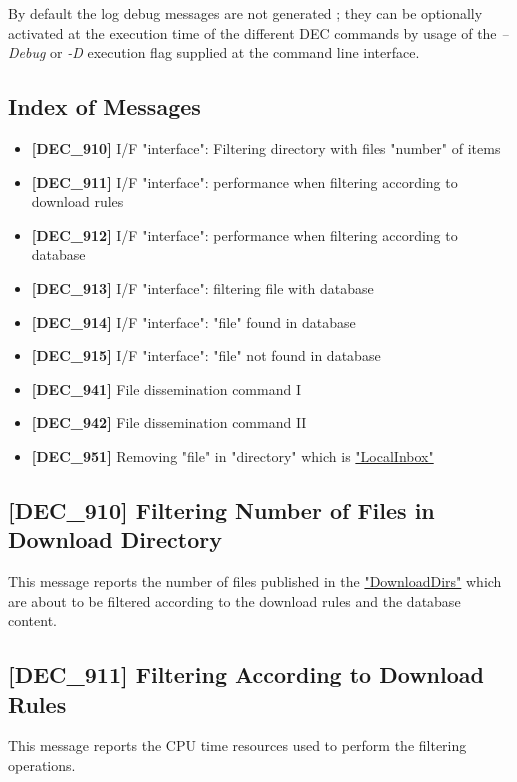 \documentclass[dec_sum_main.tex]{subfiles}
\begin{document}
\par
\noindent
By default the log debug messages are not generated ; they can be optionally activated at the execution time of the different DEC commands by usage of the \textit{--Debug} or \textit{-D} execution flag supplied at the command line interface.


\subsection{Index of Messages}

\begin{itemize}
	\item \textbf{[DEC\_910]} I/F "interface": Filtering directory with files "number" of items
	\item \textbf{[DEC\_911]} I/F "interface": performance when filtering according to download rules 
	\item \textbf{[DEC\_912]} I/F "interface": performance when filtering according to database
	\item \textbf{[DEC\_913]} I/F "interface": filtering file with database
	\item \textbf{[DEC\_914]} I/F "interface": "file" found in database
	\item \textbf{[DEC\_915]} I/F "interface": "file" not found in database	
	\item \textbf{[DEC\_941]} File dissemination command I
	\item \textbf{[DEC\_942]} File dissemination command II	
	\item \textbf{[DEC\_951]} Removing "file" in "directory" which is \hyperref[LocalInbox]{"LocalInbox"}
\end{itemize}

\subsection{[DEC\_910] Filtering Number of Files in Download Directory}
\label{DEC910}
This message reports the number of files published in the \hyperref[DownloadDirs]{"DownloadDirs"} which are about to be filtered according to the download rules and the database content.

\subsection{[DEC\_911] Filtering According to Download Rules}
\label{DEC911}
This message reports the CPU time resources used to perform the filtering operations.
\end{document}
